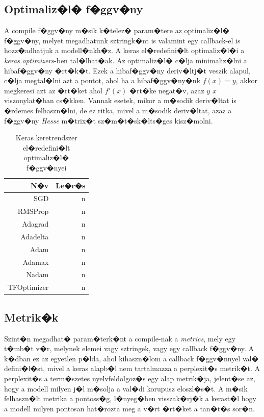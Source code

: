 \documentclass[12pt]{report}
\theoremstyle{definition}
\begin{document}
\subsection{Optimaliz�l� f�ggv�ny}
A compile f�ggv�ny m�sik k�telez� param�tere az optimaliz�l� f�ggv�ny, melyet megadhatunk sztringk�nt is valamint egy callback-el is hozz�adhatjuk a modell�nkh�z. A keras el�redefini�lt optimaliz�l�i a \textit{keras.optimizers}-ben tal�lhat�ak. Az optimaliz�l� c�lja minimaliz�lni a hibaf�ggv�ny �rt�k�t. Ezek a hibaf�ggv�ny deriv�ltj�t veszik alapul, c�lja megtal�lni azt a pontot, ahol ha a hibaf�ggv�ny�nk $f(x) = y$, akkor megkeresi azt az �rt�ket ahol $f'(x)$ �rt�ke negat�v, azaz $y$ $x$ viszonylat�ban cs�kken. Vannak esetek, mikor a m�sodik deriv�ltat is �rdemes felhaszn�lni, de ez ritka, mivel a m�sodik deriv�ltat, azaz a f�ggv�ny \textit{Hesse} m�trix�t sz�m�t�sk�lts�ges kisz�molni.

\begin{table}[!h]\label{optimizer}
	\caption{Keras keretrendszer el�redefini�lt optimaliz�l� f�ggv�nyei}
	\begin{center}
		\begin{tabular}{r|r}
			N�v&Le�r�s\\
			\hline\hline
			SGD&n\\
			RMSProp&n\\
			Adagrad&n\\
			Adadelta&n\\
			Adam&n\\
			Adamax&n\\
			Nadam&n\\
			TFOptimizer&n\\
		\end{tabular}
	\end{center}
\end{table}

\subsection{Metrik�k}

Szint�n megadhat� param�terk�nt a compile-nak a \textit{metrics}, mely egy t�mb�t v�r, melynek elemei vagy sztringek, vagy egy callback f�ggv�ny. A k�dban ez az egyetlen p�lda, ahol kihaszn�lom a callback f�ggv�nnyel val� defini�l�st, mivel a keras alapb�l nem tartalmazza a perplexit�s metrik�t. A perplexit�s a term�szetes nyelvfeldolgoz�s egy alap metrik�ja, jelent�se az, hogy a modell milyen j�l m�solja a val�di korupusz eloszl�s�t. A m�sik felhaszn�lt metrika a pontoss�g, l�nyeg�ben visszak�rj�k a kerast�l hogy a modell milyen pontosan hat�rozta meg a v�rt �rt�ket a tan�t�s sor�n. 
\end{document}

